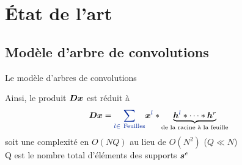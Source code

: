 \section{État de l'art}


\subsection{Modèle d'arbre de convolutions}


\begin{frame}{Le modèle d'arbres de convolutions}
\begin{figure}\centering
{}
\end{figure}
Ainsi, le produit $\bm{D}\bm{x}$ est réduit à
\begin{equation} 
\D \x = \Beq{\sum_{l \in ~\text{Feuilles}}} \x^{\Beq{l}} * \underbrace{\h^{\Beq{l}}* \dots* \h^{r}}_{\textrm{de la racine à la feuille}}
\end{equation}
soit une complexité en \alert{$O(NQ)$} au lieu de $O(N^2)$ ($Q \ll N$) \\
{\small Q est le nombre total d'éléments des supports $\bm{s}^e$}
\end{frame}
 

